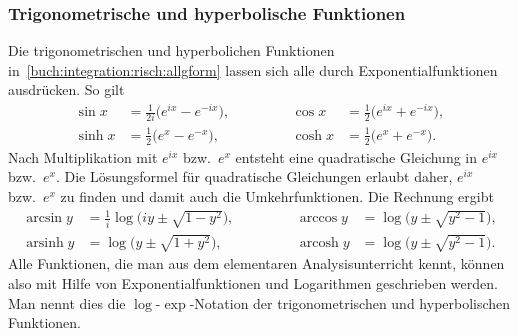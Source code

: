 \subsubsection{Trigonometrische und hyperbolische Funktionen}
Die trigonometrischen und hyperbolichen Funktionen
in~\eqref{buch:integration:risch:allgform}
lassen sich alle durch Exponentialfunktionen ausdrücken.
So gilt
\begin{equation}
\begin{aligned}
\sin x &= \frac{1}{2i}\bigl( e^{ix} - e^{-ix}\bigr),
&
&\qquad&
\cos x &= \frac{1}{2}\bigl( e^{ix} + e^{-ix}\bigr),
\\
\sinh x &= \frac12\bigl( e^x - e^{-x} \bigr),
&
&\qquad&
\cosh x &= \frac12\bigl( e^x + e^{-x} \bigr).
\end{aligned}
\label{buch:integral:risch:trighyp}
\end{equation}
Nach Multiplikation mit $e^{ix}$ bzw.~$e^{x}$ entsteht eine
quadratische Gleichung in $e^{ix}$ bzw.~$e^{x}$.
Die Lösungsformel für quadratische Gleichungen erlaubt daher, $e^{ix}$
bzw.~$e^{x}$ zu finden und damit auch die Umkehrfunktionen.
Die Rechnung ergibt
\begin{equation}
\begin{aligned}
\arcsin y
&=
\frac{1}{i}\log\bigl(
iy\pm\sqrt{1-y^2}
\bigr),
&
&\qquad&
\arccos y
&=
\log\bigl(
y\pm \sqrt{y^2-1}
\bigr),
\\
\operatorname{arsinh}y
&=
\log\bigl(
y \pm \sqrt{1+y^2}
\bigr),
&
&\qquad&
\operatorname{arcosh} y
&=
\log\bigl(
y\pm \sqrt{y^2-1}
\bigr).
\end{aligned}
\label{buch:integral:risch:trighypinv}
\end{equation}
Alle Funktionen, die man aus dem elementaren Analysisunterricht
kennt, können also mit Hilfe von Exponentialfunktionen und Logarithmen
geschrieben werden.
Man nennt dies die $\log$-$\exp$-Notation der trigonometrischen
und hyperbolischen Funktionen.
%

